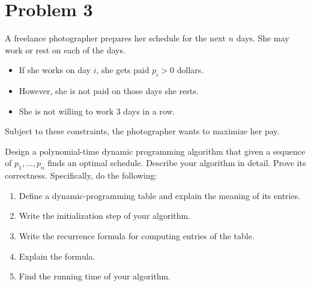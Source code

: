 \newpage
\section{Problem 3}
A freelance photographer prepares her schedule for the next $n$ days. She may work or rest on each of the days.
\begin{itemize}
    \item If she works on day $i$, she gets paid $p_i > 0$ dollars.
    \item However, she is not paid on those days she rests.
    \item She is not willing to work 3 days in a row.
\end{itemize}
Subject to these constraints, the photographer wants to maximize her pay.\par
Design a polynomial-time dynamic programming algorithm that given a sequence of $p_1, ..., p_n$ finds an optimal schedule. Describe your algorithm in detail. Prove its correctness. Specifically, do the following:
\begin{enumerate}
    \item Define a dynamic-programming table and explain the meaning of its entries.
    \item Write the initialization step of your algorithm.
    \item Write the recurrence formula for computing entries of the table.
    \item Explain the formula.
    \item Find the running time of your algorithm.
\end{enumerate}
\partbreak
